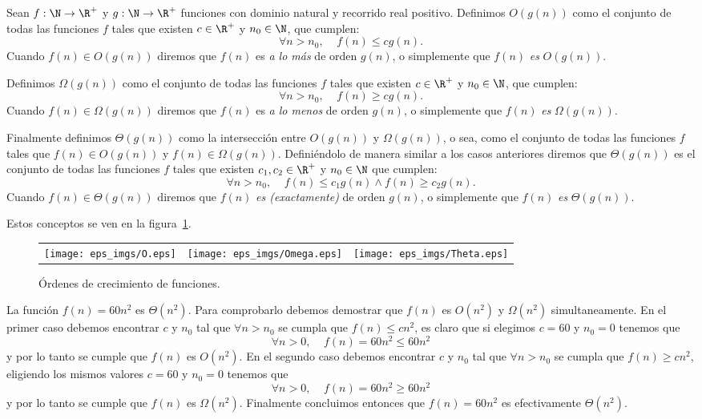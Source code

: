\begin{definicion}
Sean $f:\N\rightarrow\R^+$ y $g:\N\rightarrow\R^+$ funciones con dominio natural y recorrido real positivo.
	Definimos $O(g(n))$ como el conjunto de todas las funciones $f$ tales que existen $c\in\R^+$ y $n_0\in\N$, que cumplen:
	\[
	\forall n>n_0,\;\;\;\; f(n)\leq cg(n).
	\]
	Cuando $f(n)\in O(g(n))$ diremos que $f(n)$ es \emph{a lo más} de orden $g(n)$, o simplemente que $f(n)$ \emph{es} $O(g(n))$.
	
	Definimos $\Omega(g(n))$ como el conjunto de todas las funciones $f$ tales que existen $c\in\R^+$ y $n_0\in\N$, que cumplen:
	\[
	\forall n>n_0,\;\;\;\; f(n)\geq cg(n).
	\]
	Cuando $f(n)\in \Omega(g(n))$ diremos que $f(n)$ es \emph{a lo menos} de orden $g(n)$, o simplemente que $f(n)$ \emph{es} $\Omega(g(n))$.

  Finalmente definimos $\Theta(g(n))$ como la intersección entre $O(g(n))$ y $\Omega(g(n))$, o sea, como el conjunto de todas las funciones $f$ tales que $f(n)\in O(g(n))$ y $f(n)\in\Omega(g(n))$.
  Definiéndolo de manera similar a los casos anteriores diremos que $\Theta(g(n))$ es el conjunto de todas las funciones $f$ tales que existen $c_1,c_2\in\R^+$ y $n_0\in\N$ que cumplen:
  \[
	\forall n>n_0,\;\;\;\; f(n)\leq c_1g(n)\wedge f(n)\geq c_2g(n).
	\]
  Cuando $f(n)\in \Theta(g(n))$ diremos que $f(n)$ \emph{es (exactamente)} de orden $g(n)$, o simplemente que $f(n)$ \emph{es} $\Theta(g(n))$.
  
  Estos conceptos se ven en la figura~\ref{fig:complexity-notation}.
\end{definicion}

\begin{figure}[h!]
\centering 
\begin{tabular}{ccc}
\texttt{[image: eps\_imgs/O.eps]}&
\texttt{[image: eps\_imgs/Omega.eps]}&
\texttt{[image: eps\_imgs/Theta.eps]}
\end{tabular}
\caption{Órdenes de crecimiento de funciones.}
\label{fig:complexity-notation}
\end{figure}

\begin{ejemplo}
La función $f(n)=60n^2$ es $\Theta(n^2)$.
Para comprobarlo debemos demostrar que $f(n)$ es $O(n^2)$ y $\Omega(n^2)$ simultaneamente.
En el primer caso debemos encontrar $c$ y $n_0$ tal que $\forall n>n_0$ se cumpla que $f(n)\leq cn^2$, es claro que si elegimos $c=60$ y $n_0=0$ tenemos que
\[
\forall n>0,\;\;\;\; f(n)=60n^2\leq 60n^2
\]
y por lo tanto se cumple que $f(n)$ es $O(n^2)$.
En el segundo caso debemos encontrar $c$ y $n_0$ tal que $\forall n>n_0$ se cumpla que $f(n)\geq cn^2$, eligiendo los mismos valores $c=60$ y $n_0=0$ tenemos que
\[
\forall n>0,\;\;\;\; f(n)=60n^2\geq 60n^2
\]
y por lo tanto se cumple que $f(n)$ es $\Omega(n^2)$.
Finalmente concluimos entonces que $f(n)=60n^2$ es efectivamente $\Theta(n^2)$.
\end{ejemplo}

